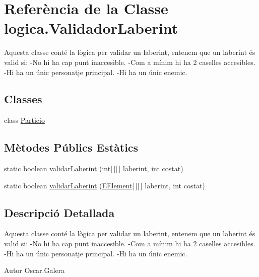 \hypertarget{classlogica_1_1_validador_laberint}{\section{Referència de la Classe logica.\+Validador\+Laberint}
\label{classlogica_1_1_validador_laberint}
}


Aquesta classe conté la lògica per validar un laberint, entenem que un laberint és valid si\+: -\/\+No hi ha cap punt inaccesible. -\/\+Com a mínim hi ha 2 caselles accesibles. -\/\+Hi ha un únic personatje principal. -\/\+Hi ha un únic enemic.  


\subsection*{Classes}
\begin{DoxyCompactItemize}
\item 
class \hyperlink{classlogica_1_1_validador_laberint_1_1_particio}{Particio}
\end{DoxyCompactItemize}
\subsection*{Mètodes Públics Estàtics}
\begin{DoxyCompactItemize}
\item 
static boolean \hyperlink{classlogica_1_1_validador_laberint_ae68bc2619d7584ee5706305220edf18f}{validar\+Laberint} (int\mbox{[}$\,$\mbox{]}\mbox{[}$\,$\mbox{]} laberint, int costat)
\item 
static boolean \hyperlink{classlogica_1_1_validador_laberint_ab3c011bc020892b76d217106b2903bd4}{validar\+Laberint} (\hyperlink{enumlogica_1_1enumeracions_1_1_e_element}{E\+Element}\mbox{[}$\,$\mbox{]}\mbox{[}$\,$\mbox{]} laberint, int costat)
\end{DoxyCompactItemize}


\subsection{Descripció Detallada}
Aquesta classe conté la lògica per validar un laberint, entenem que un laberint és valid si\+: -\/\+No hi ha cap punt inaccesible. -\/\+Com a mínim hi ha 2 caselles accesibles. -\/\+Hi ha un únic personatje principal. -\/\+Hi ha un únic enemic. 

\begin{DoxyAuthor}{Autor}
Oscar.\+Galera 
\end{DoxyAuthor}


